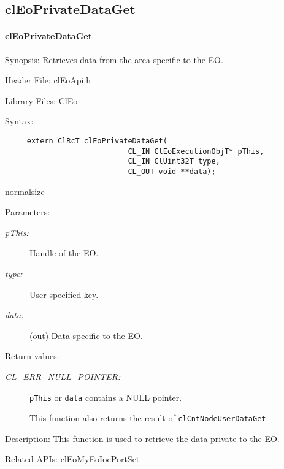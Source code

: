 \begin{flushleft}
  \newpage
\subsection{clEoPrivateDataGet}
\hypertarget{pageeo113}{}\paragraph{cl\-Eo\-Private\-Data\-Get}\label{pageeo113}
\begin{Desc}
\item[Synopsis:]Retrieves data from the area specific to the EO.\end{Desc}
\begin{Desc}
\item[Header File:]clEoApi.h\end{Desc}
\begin{Desc}
\item[Library Files:]Cl\-Eo\end{Desc}
\begin{Desc}
\item[Syntax:]

\footnotesize\begin{verbatim}     extern ClRcT clEoPrivateDataGet(
                 			CL_IN ClEoExecutionObjT* pThis,
                 			CL_IN ClUint32T type,
                 			CL_OUT void **data);
\end{verbatim}
  normalsize
\end{Desc}
\begin{Desc}
\item[Parameters:]
\begin{description}
\item[{\em p\-This:}]Handle of the EO. 
\item[{\em type:}]User specified key. 
\item[{\em data:}](out) Data specific to the EO.\end{description}
\end{Desc}
\begin{Desc}
\item[Return values:]
\begin{description}

\item[{\em CL\_\-ERR\_\-NULL\_\-POINTER:}] {\tt{pThis}} or {\tt{data}} contains a NULL pointer.\par
 This function also returns the result of {\tt{cl\-Cnt\-Node\-User\-Data\-Get}}.
 \end{description}
 \end{Desc}
\begin{Desc}
\item[Description:]This function is used to retrieve the data private to the EO.\end{Desc}
\begin{Desc}
\item[Related APIs:]\hyperlink{pageeo116}{cl\-Eo\-My\-Eo\-Ioc\-Port\-Set} \end{Desc}




\end{flushleft}
